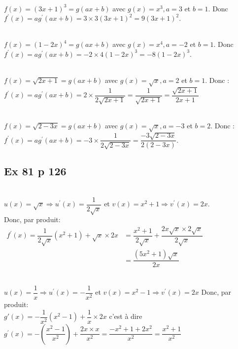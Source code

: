 \documentclass[12pt,a4paper]{book}
\begin{document}
\begin{enumMet}
    \item {}\\
    $f(x)=(3 x+1)^{3}=g(a x+b)$ avec $g(x)=x^{3}, a=3$ et $b=1 .$ Donc\\
    $f^{\prime}(x)=a g^{\prime}(a x+b)=3 \times 3(3 x+1)^{2}=9(3 x+1)^{2}$.
    \item {}\\
    $f(x)=(1-2 x)^{4}=g(a x+b)$ avec $g(x)=x^{4}, a=-2$ et $b=1$. Donc\\
    $f^{\prime}(x)=a g^{\prime}(a x+b)=-2 \times 4(1-2 x)^{3}=-8(1-2 x)^{3}$.
    \item {}\\
    $f(x)=\sqrt{2 x+1}=g(a x+b)$ avec $g(x)=\sqrt{x}, a=2$ et $b=1 .$ Donc : \\
    $f^{\prime}(x)=a g^{\prime}(a x+b)=2 \times \dfrac{1}{2 \sqrt{2 x+1}}=\dfrac{1}{\sqrt{2 x+1}}=\dfrac{\sqrt{2 x+1}}{2 x+1}$
    \item {}\\
    $f(x)=\sqrt{2-3 x}=g(a x+b)$ avec $g(x)=\sqrt{x}, a=-3$ et $b=2$. Donc : \\
    $f^{\prime}(x)=a g^{\prime}(a x+b)=-3 \times \dfrac{1}{2 \sqrt{2-3 x}}=\dfrac{-3 \sqrt{2-3 x}}{2(2-3 x)}$.
\end{enumMet}

\subsection*{Ex 81 p 126}
\begin{enumMet}
    \item {}\\
    $u(x)=\sqrt{x} \Rightarrow u^{\prime}(x)=\dfrac{1}{2 \sqrt{x}}$ et $v(x)=x^{2}+1 \Rightarrow v^{\prime}(x)=2 x$.\\
    Donc, par produit:\\
$\begin{aligned} f^{\prime}(x)=\dfrac{1}{2 \sqrt{x}}\left(x^{2}+1\right)+\sqrt{x} \times 2 x &=\dfrac{x^{2}+1}{2 \sqrt{x}}+\dfrac{2 x \sqrt{x} \times 2 \sqrt{x}}{2 \sqrt{x}} \\ &=\dfrac{\left(5 x^{2}+1\right) \sqrt{x}}{2 x} \end{aligned}$
    \item {}\\
    $u(x)=\dfrac{1}{x} \Rightarrow u^{\prime}(x)=-\dfrac{1}{x^{2}}$ et $v(x)=x^{2}-1 \Rightarrow v^{\prime}(x)=2 x$
Donc, par produit:\\
$g'(x)=-\dfrac{1}{x^{2}}\left(x^{2}-1\right)+\dfrac{1}{x} \times 2 x$ c'est à dire\\
$g^{\prime}(x)=-\left(\dfrac{x^{2}-1}{x^{2}}\right)+\dfrac{2 x \times x}{x^{2}}=\dfrac{-x^{2}+1+2 x^{2}}{x^{2}}=\dfrac{x^{2}+1}{x^{2}}$
\end{enumMet}
\end{document}
